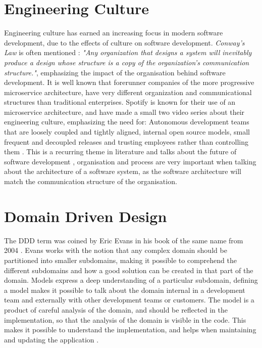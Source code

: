 \section{Engineering Culture}
Engineering culture has earned an increasing focus in modern software development, due to the effects of culture on software development. \textit{Conway's Law} is often mentioned \cite{newman2014demystifying}: \textit{ "Any organization that designs a system will inevitably produce a design whose structure is a copy of the organization's communication structure."}, emphasizing the impact of the organisation behind software development. It is well known that forerunner companies of the more progressive microservice architecture, have very different organization and communicational structures than traditional enterprises. Spotify is known for their use of an microservice architecture, and have made a small two video series about their engineering culture, emphasizing the need for: Autonomous development teams that are loosely coupled and tightly aligned, internal open source models, small frequent and decoupled releases and trusting employees rather than controlling them  \cite{kniberg2014spotify}. This is a recurring theme in literature and talks about the future of software development \cite[p.~5]{nygard2007release} \cite[p.13]{newman2015microservices} \cite[t.~34:32]{george2016it} \cite{fowler2014microservices} \cite[t.~25:30]{fowler2014microservicesoamonolith}, organisation and process are very important when talking about the architecture of a software system, as the software architecture will match the communication structure of the organisation.


\section{Domain Driven Design}
\label{sec:DDD}
The DDD term was coined by Eric Evans in his book of the same name from 2004 \cite[preface]{evans2004domain}. Evans works with the notion that any complex domain should be partitioned into smaller subdomains, making it possible to comprehend the different subdomains and how a good solution can be created in that part of the domain. Models express a deep understanding of a particular subdomain, defining a model makes it possible to talk about the domain internal in a development team and externally with other development teams or customers. The model is a product of careful analysis of the domain, and should be reflected in the implementation, so that the analysis of the domain is visible in the code. This makes it possible to understand the implementation, and helps when maintaining and updating the application \cite[p.~2]{evans2004domain}.

